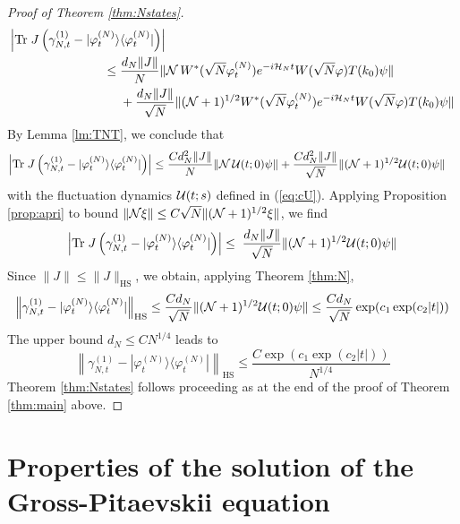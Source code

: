 \documentclass[11pt,a4paper,DIV11]{scrartcl}	%
\newcommand{\cU}{{\cal U}}
\newcommand{\tr}{\mbox{Tr}}
\newcommand{\cH}{{\cal H}}
\newcommand{\cN}{{\cal N}}
\begin{document}
\begin{proof}[Proof of Theorem \ref{thm:Nstates}]
 \[ \begin{split} \Big| \tr \; J  \, \Big( \gamma^{(1)}_{N,t} - |\varphi_t^{(N)} \rangle &\langle \varphi^{(N)}_t| \Big) \Big| \\ \leq \; & \frac{d_N \| J \|}{N}  \| \cN \, W^* (\sqrt{N} \varphi^{(N)}_t)  e^{-i \cH_N t} W(\sqrt{N} \varphi) T(k_0) \psi \| \\
 &+ \frac{d_N \| J \|}{\sqrt{N}}  \| (\cN +1)^{1/2} W^* (\sqrt{N} \varphi^{(N)}_t)  e^{-i \cH_N t} W(\sqrt{N} \varphi) T(k_0) \psi \| \end{split} \]
By Lemma \ref{lm:TNT}, we conclude that
\[ \begin{split}  \left| \tr \; J \left( \gamma^{(1)}_{N,t} - |\varphi_t^{(N)} \rangle \langle \varphi^{(N)}_t| \right) \right| \leq \; & \frac{C d_N^2 \| J \|}{N}  \| \cN \, \cU (t;0) \psi \| + \frac{C d_N^2 \| J \|}{\sqrt{N}}  \| (\cN +1)^{1/2} \cU (t;0) \psi \| \end{split} \]
 with the fluctuation dynamics $\cU (t;s)$ defined in (\ref{eq:cU}). Applying Proposition \ref{prop:apri} to bound $\| \cN \xi \| \leq C \sqrt{N} \| (\cN+1)^{1/2} \xi \|$, we find
 \[ \left| \tr \; J \left( \gamma^{(1)}_{N,t} - |\varphi_t^{(N)} \rangle \langle \varphi^{(N)}_t| \right) \right| \leq \;  \frac{d_N \| J \|}{\sqrt{N}}  \| (\cN +1)^{1/2} \cU (t;0) \psi \| \]
Since $\| J \| \leq \| J \|_{\text{HS}}$, we obtain, applying Theorem \ref{thm:N},
 \[ \left\| \gamma^{(1)}_{N,t} - |\varphi_t^{(N)} \rangle \langle \varphi^{(N)}_t| \right\|_{\text{HS}} \leq \frac{C d_N}{\sqrt{N}} \| (\cN+1)^{1/2} \cU (t;0) \psi \| \leq \frac{C d_N}{\sqrt{N}} \exp (c_1 \exp (c_2 |t|)) \]
 The upper bound $d_N \leq C N^{1/4}$ leads to
 \[ \left\| \gamma^{(1)}_{N,t} - |\varphi_t^{(N)} \rangle \langle \varphi^{(N)}_t| \right\|_{\text{HS}} \leq \frac{C\exp ( c_1 \exp (c_2 |t|))}{N^{1/4}}\]
Theorem \ref{thm:Nstates} follows proceeding as at the end of the proof of Theorem \ref{thm:main} above.
\end{proof} 




\appendix


\section{Properties of the solution of the Gross-Pitaevskii equation}
\label{s:pde}
\end{document}
